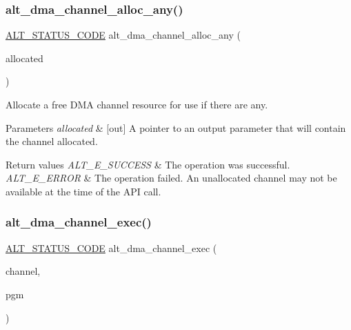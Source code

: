 \subsubsection{\texorpdfstring{alt\_dma\_channel\_alloc\_any()}{alt\_dma\_channel\_alloc\_any()}}
{\footnotesize\ttfamily \mbox{\hyperlink{hwlib_8h_abdb0d369f069723ca55d6c94bcaaaa12}{A\+L\+T\+\_\+\+S\+T\+A\+T\+U\+S\+\_\+\+C\+O\+DE}} alt\+\_\+dma\+\_\+channel\+\_\+alloc\+\_\+any (\begin{DoxyParamCaption}\item[{\mbox{\hyperlink{group__ALT__DMA__COMMON_ga959232e3b00ce45a3049183cce4c9d59}{A\+L\+T\+\_\+\+D\+M\+A\+\_\+\+C\+H\+A\+N\+N\+E\+L\+\_\+t}} $\ast$}]{allocated }\end{DoxyParamCaption})}

Allocate a free D\+MA channel resource for use if there are any.


\begin{DoxyParams}{Parameters}
{\em allocated} & \mbox{[}out\mbox{]} A pointer to an output parameter that will contain the channel allocated.\\
\hline
\end{DoxyParams}

\begin{DoxyRetVals}{Return values}
{\em A\+L\+T\+\_\+\+E\+\_\+\+S\+U\+C\+C\+E\+SS} & The operation was successful. \\
\hline
{\em A\+L\+T\+\_\+\+E\+\_\+\+E\+R\+R\+OR} & The operation failed. An unallocated channel may not be available at the time of the A\+PI call. \\
\hline
\end{DoxyRetVals}
\mbox{\label{group__ALT__DMA__CSR_gac948d0a8fa737070efc6b0d2d6570420}} 
\subsubsection{\texorpdfstring{alt\_dma\_channel\_exec()}{alt\_dma\_channel\_exec()}}
{\footnotesize\ttfamily \mbox{\hyperlink{hwlib_8h_abdb0d369f069723ca55d6c94bcaaaa12}{A\+L\+T\+\_\+\+S\+T\+A\+T\+U\+S\+\_\+\+C\+O\+DE}} alt\+\_\+dma\+\_\+channel\+\_\+exec (\begin{DoxyParamCaption}\item[{\mbox{\hyperlink{group__ALT__DMA__COMMON_ga959232e3b00ce45a3049183cce4c9d59}{A\+L\+T\+\_\+\+D\+M\+A\+\_\+\+C\+H\+A\+N\+N\+E\+L\+\_\+t}}}]{channel,  }\item[{\mbox{\hyperlink{group__ALT__DMA__PRG_gadb7028531574894854db4db6d797de97}{A\+L\+T\+\_\+\+D\+M\+A\+\_\+\+P\+R\+O\+G\+R\+A\+M\+\_\+t}} $\ast$}]{pgm }\end{DoxyParamCaption})}

